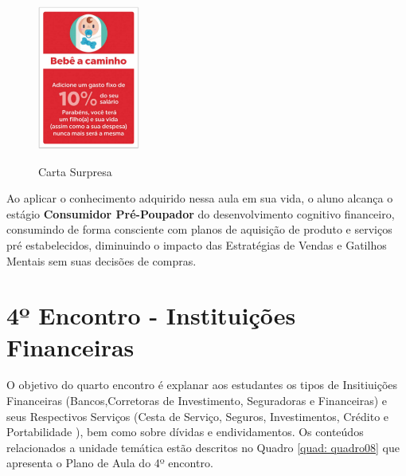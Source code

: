 \graphicspath{{figuras/}} 
\begin{figure}[!ht]
\centering
\begin{minipage}{1.\textwidth}
\caption{Carta Surpresa}
\centering
\includegraphics[width=0.3\textwidth]{10-figura_carta-surpresa-renda-passiva}
\label{fig: 10-figura}
\end{minipage}
\end{figure}

Ao aplicar o conhecimento adquirido nessa aula em sua vida, o aluno alcança o estágio \textbf{Consumidor Pré-Poupador} do desenvolvimento cognitivo financeiro, consumindo de forma consciente com planos de aquisição de produto e serviços pré estabelecidos, diminuindo o impacto das Estratégias de Vendas e Gatilhos Mentais sem suas decisões de compras.

\section{4º Encontro - Instituições Financeiras}
O objetivo do quarto encontro é explanar aos estudantes os tipos de Insitiuições Financeiras (Bancos,Corretoras de Investimento, Seguradoras e Financeiras) e seus Respectivos Serviços (Cesta de Serviço, Seguros, Investimentos, Crédito e Portabilidade ), bem como sobre dívidas e endividamentos. Os conteúdos relacionados a unidade temática estão descritos no Quadro \ref{quad: quadro08} que apresenta o Plano de Aula do 4º encontro.

